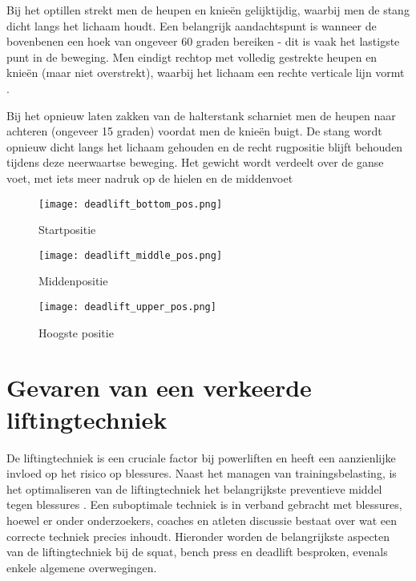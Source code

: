 \medskip

Bij het optillen strekt men de heupen en knieën gelijktijdig, waarbij men de stang dicht langs het lichaam houdt. 
Een belangrijk aandachtspunt is wanneer de bovenbenen een hoek van ongeveer 60 graden bereiken - dit is vaak het lastigste punt in de beweging. 
Men eindigt rechtop met volledig gestrekte heupen en knieën (maar niet overstrekt), waarbij het lichaam een rechte verticale lijn vormt \autocite{Ronai2020}.

\medskip

Bij het opnieuw laten zakken van de halterstank scharniet men de heupen naar achteren (ongeveer 15 graden) voordat men de knieën buigt.
De stang wordt opnieuw dicht langs het lichaam gehouden en de recht rugpositie blijft behouden tijdens deze neerwaartse beweging.
Het gewicht wordt verdeelt over de ganse voet, met iets meer nadruk op de hielen en de middenvoet \autocite{Ronai2020}

\begin{figure}[h]
  \centering
  \begin{minipage}[t]{0.32\textwidth}
    \centering
    \texttt{[image: deadlift\_bottom\_pos.png]}
    \caption[Startpositie deadlift]{\label{fig:deadlift_startpositie} Startpositie \autocite{Ronai2020}}
  \end{minipage}
  \hfill
  \begin{minipage}[t]{0.32\textwidth}
    \centering
    \texttt{[image: deadlift\_middle\_pos.png]}
    \caption[Middenste positie deadlift]{\label{fig:deadlift_middenpositie} Middenpositie \autocite{Ronai2020}}
  \end{minipage}
  \hfill
  \begin{minipage}[t]{0.32\textwidth}
    \centering
    \texttt{[image: deadlift\_upper\_pos.png]}
    \caption[Hoogste positie deadlift]{\label{fig:deadlift_bovenpositie} Hoogste positie \autocite{Ronai2020}}
  \end{minipage}
\end{figure}

\section{Gevaren van een verkeerde liftingtechniek}
\label{sec:gevaren-verkeerde-liftingtechniek}
De liftingtechniek is een cruciale factor bij powerliften en heeft een aanzienlijke invloed op het risico op blessures. 
Naast het managen van trainingsbelasting, is het optimaliseren van de liftingtechniek het belangrijkste preventieve middel tegen blessures \autocite{StrömbäckEtAl2018}. 
Een suboptimale techniek is in verband gebracht met blessures, hoewel er onder onderzoekers, coaches en atleten discussie bestaat over wat een correcte techniek precies inhoudt. 
Hieronder worden de belangrijkste aspecten van de liftingtechniek bij de squat, bench press en deadlift besproken, evenals enkele algemene overwegingen.

